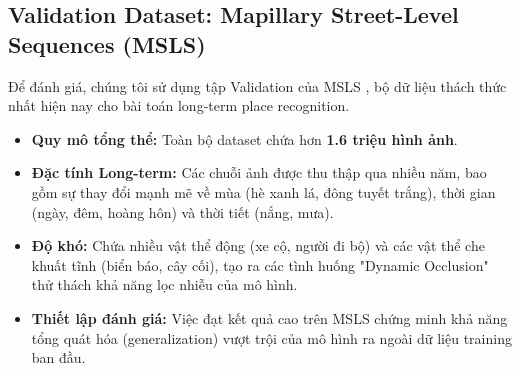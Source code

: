 \documentclass[12pt,a4paper]{article}
\begin{document}
    \subsection{Validation Dataset: Mapillary Street-Level Sequences (MSLS)}
    
    Để đánh giá, chúng tôi sử dụng tập Validation của MSLS \cite{warburg2020msls}, bộ dữ liệu thách thức nhất hiện nay cho bài toán long-term place recognition.

    \begin{itemize}
        \item \textbf{Quy mô tổng thể:} Toàn bộ dataset chứa hơn \textbf{1.6 triệu hình ảnh}.
        \item \textbf{Đặc tính Long-term:} Các chuỗi ảnh được thu thập qua nhiều năm, bao gồm sự thay đổi mạnh mẽ về mùa (hè xanh lá, đông tuyết trắng), thời gian (ngày, đêm, hoàng hôn) và thời tiết (nắng, mưa).
        \item \textbf{Độ khó:} Chứa nhiều vật thể động (xe cộ, người đi bộ) và các vật thể che khuất tĩnh (biển báo, cây cối), tạo ra các tình huống "Dynamic Occlusion" thử thách khả năng lọc nhiễu của mô hình.
        \item \textbf{Thiết lập đánh giá:} Việc đạt kết quả cao trên MSLS chứng minh khả năng tổng quát hóa (generalization) vượt trội của mô hình ra ngoài dữ liệu training ban đầu.
    \end{itemize}


    \printbibliography %
    
    
\end{document}
